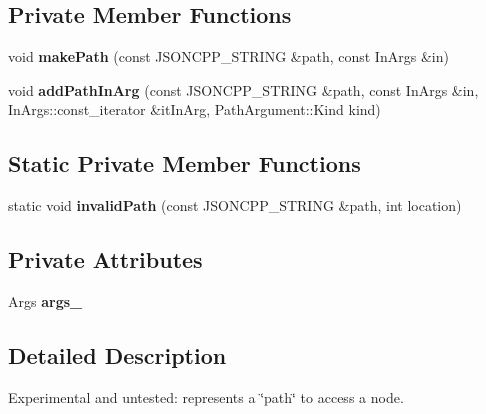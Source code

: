\subsection*{Private Member Functions}
\begin{DoxyCompactItemize}
\item 
\mbox{\label{classJson_1_1Path_a362a420a47acb1a1f9c79173cbfef94d}} 
void {\bfseries make\+Path} (const J\+S\+O\+N\+C\+P\+P\+\_\+\+S\+T\+R\+I\+NG \&path, const In\+Args \&in)
\item 
\mbox{\label{classJson_1_1Path_ae65717a5fbc35b1336cbf783b15aad2e}} 
void {\bfseries add\+Path\+In\+Arg} (const J\+S\+O\+N\+C\+P\+P\+\_\+\+S\+T\+R\+I\+NG \&path, const In\+Args \&in, In\+Args\+::const\+\_\+iterator \&it\+In\+Arg, Path\+Argument\+::\+Kind kind)
\end{DoxyCompactItemize}
\subsection*{Static Private Member Functions}
\begin{DoxyCompactItemize}
\item 
\mbox{\label{classJson_1_1Path_a0fa77fc0cefefcfcf2f1242c79009dd9}} 
static void {\bfseries invalid\+Path} (const J\+S\+O\+N\+C\+P\+P\+\_\+\+S\+T\+R\+I\+NG \&path, int location)
\end{DoxyCompactItemize}
\subsection*{Private Attributes}
\begin{DoxyCompactItemize}
\item 
\mbox{\label{classJson_1_1Path_af33d0de7ee9f99d3e361bdf504dc2bc7}} 
Args {\bfseries args\+\_\+}
\end{DoxyCompactItemize}


\subsection{Detailed Description}
Experimental and untested\+: represents a \char`\"{}path\char`\"{} to access a node. 

